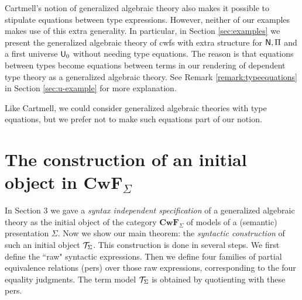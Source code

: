 \documentclass{lmcs}
\newcommand{\FYI}[1]{{\color{red}#1}}
\def\Cwf{\mathbf{CwF}}
\begin{document}
\begin{remark}
Cartmell's notion of generalized algebraic theory \cite{cartmell:phd,cartmell:apal} also makes it possible to stipulate equations between type expressions. However, neither of our examples makes use of this extra generality. In particular,  in Section \ref{sec:examples} we present the generalized algebraic theory of cwfs with extra structure for $\mathsf{N}, \Pi$ and a first universe $\mathsf{U}_0$ without needing type equations. The reason is that
equations between types become equations between terms in our rendering
of dependent type theory as a generalized algebraic theory. See Remark \ref{remark:typeequations} in Section \ref{sec:u-example} for more explanation.

Like Cartmell, we could consider generalized algebraic theories with type equations, but we prefer not to make such equations part of our notion.


\end{remark}



\section{The construction of an initial object in $\Cwf_\Sigma$}\label{initial-gat-section}

In Section 3 we gave a {\em syntax independent specification} of a generalized algebraic theory as the initial object of the category $\Cwf_\Sigma$ of models of a (semantic) \FYI{presentation} $\Sigma$. Now we show our main theorem: the {\em syntactic construction} of such an initial object ${\mathcal T}_\Sigma$. This construction is done in several steps. We first define the ``raw" syntactic expressions. Then we define four families of partial equivalence relations (pers) over those raw expressions, corresponding to the four equality judgments. The term model ${\mathcal T}_\Sigma$ is obtained by quotienting with these pers.
\end{document}
